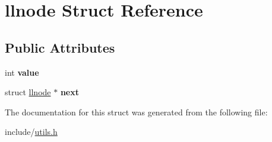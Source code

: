 \hypertarget{structllnode}{\section{llnode Struct Reference}
\label{structllnode}
}
\subsection*{Public Attributes}
\begin{DoxyCompactItemize}
\item 
\hypertarget{structllnode_a8cfddb35403700ece0ac0f56113a5f08}{int {\bfseries value}}\label{structllnode_a8cfddb35403700ece0ac0f56113a5f08}

\item 
\hypertarget{structllnode_a27cb227d8575dd4c3ebd11e5a7045bb5}{struct \hyperlink{structllnode}{llnode} $\ast$ {\bfseries next}}\label{structllnode_a27cb227d8575dd4c3ebd11e5a7045bb5}

\end{DoxyCompactItemize}


The documentation for this struct was generated from the following file\+:\begin{DoxyCompactItemize}
\item 
include/\hyperlink{utils_8h}{utils.\+h}\end{DoxyCompactItemize}
